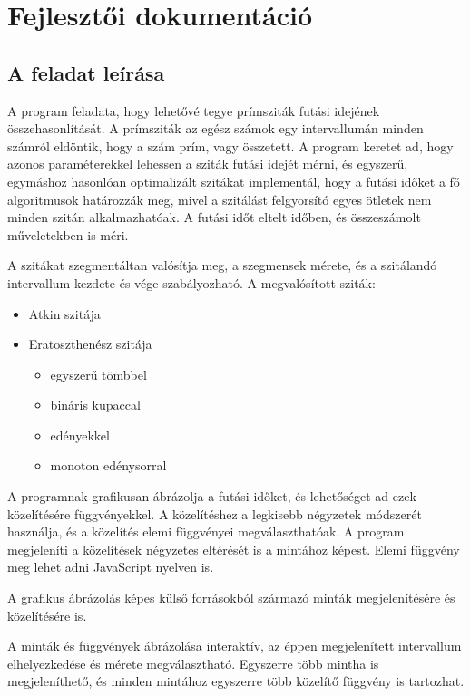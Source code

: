 \chapter{Fejlesztői dokumentáció}

\section{A feladat leírása}

A program feladata, hogy lehetővé tegye prímsziták futási idejének összehasonlítását.
A prímsziták az egész számok egy intervallumán
minden számról eldöntik, hogy a szám prím, vagy összetett.
A program keretet ad, hogy azonos paraméterekkel lehessen a sziták futási idejét mérni,
és egyszerű, egymáshoz hasonlóan optimalizált szitákat implementál,
hogy a futási időket a fő algoritmusok határozzák meg, mivel a szitálást felgyorsító
egyes ötletek nem minden szitán alkalmazhatóak.
A futási időt eltelt időben, és összeszámolt műveletekben is méri.

A szitákat szegmentáltan valósítja meg,
a szegmensek mérete, és a szitálandó intervallum
kezdete és vége szabályozható. A megvalósított sziták:
\begin{itemize}
\item Atkin szitája
\item Eratoszthenész szitája
\begin{itemize}
\item egyszerű tömbbel
\item bináris kupaccal
\item edényekkel
\item monoton edénysorral
\end{itemize}
\end{itemize}

A programnak grafikusan ábrázolja a futási időket, és lehetőséget ad
ezek közelítésére függvényekkel. A közelítéshez a legkisebb négyzetek módszerét használja,
és a közelítés elemi függvényei megválaszthatóak.
A program megjeleníti a közelítések négyzetes eltérését is a mintához képest.
Elemi függvény meg lehet adni JavaScript nyelven is.

A grafikus ábrázolás képes külső forrásokból származó minták megjelenítésére és közelítésére is.

A minták és függvények ábrázolása interaktív, az éppen megjelenített
intervallum elhelyezkedése és mérete megválasztható.
Egyszerre több mintha is megjeleníthető,
és minden mintához egyszerre több közelítő függvény is tartozhat.


